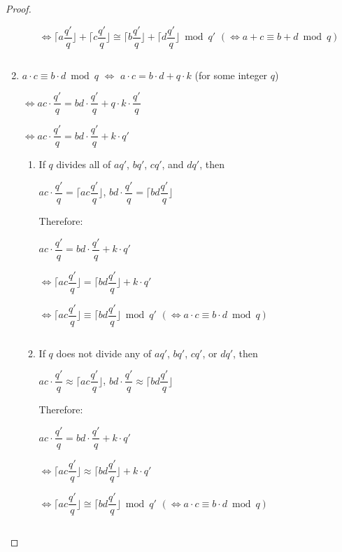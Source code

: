 \begin{proof}
\begin{enumerate}
\begin{enumerate}
$\Longleftrightarrow \Bigg\lceil a\dfrac{q'}{q}\Bigg\rfloor + \Bigg\lceil c\dfrac{q'}{q}\Bigg\rfloor \cong \Bigg\lceil b\dfrac{q'}{q}\Bigg\rfloor + \Bigg\lceil d\dfrac{q'}{q}\Bigg\rfloor \bmod q'$ \text{ } $(\Longleftrightarrow a + c \equiv b + d \bmod q)$

\end{enumerate}

$ $

\item $a \cdot c\equiv b \cdot d\bmod q$ $\Longleftrightarrow$ $a \cdot c = b \cdot d + q\cdot k$ (for some integer $q$)

$\Longleftrightarrow ac \cdot \dfrac{q'}{q}  = bd \cdot \dfrac{q'}{q} + q\cdot k \cdot \dfrac{q'}{q}$

$\Longleftrightarrow ac \cdot \dfrac{q'}{q}  = bd \cdot \dfrac{q'}{q} + k\cdot q'$

\begin{enumerate}

\item If $q$ divides all of $aq'$, $bq'$, $cq'$, and $dq'$, then 

$ac \cdot \dfrac{q'}{q} = \Bigg\lceil ac\dfrac{q'}{q}\Bigg\rfloor$, \text{ } $bd \cdot \dfrac{q'}{q} = \Bigg\lceil bd\dfrac{q'}{q}\Bigg\rfloor$

Therefore:

$ac \cdot \dfrac{q'}{q} = bd \cdot \dfrac{q'}{q} + k\cdot q'$

$\Longleftrightarrow \Bigg\lceil ac\dfrac{q'}{q}\Bigg\rfloor = \Bigg\lceil bd\dfrac{q'}{q}\Bigg\rfloor + k\cdot q'$

$\Longleftrightarrow \Bigg\lceil ac\dfrac{q'}{q}\Bigg\rfloor \equiv \Bigg\lceil bd\dfrac{q'}{q}\Bigg\rfloor \bmod q'$ \text{ } $(\Longleftrightarrow a\cdot c \equiv b\cdot d \bmod q)$

$ $

\item If $q$ does not divide any of $aq'$, $bq'$, $cq'$, or $dq'$, then

$ac \cdot \dfrac{q'}{q} \approx \Bigg\lceil ac\dfrac{q'}{q}\Bigg\rfloor$, \text{ } $bd \cdot \dfrac{q'}{q} \approx \Bigg\lceil bd\dfrac{q'}{q}\Bigg\rfloor$

Therefore:

$ac \cdot \dfrac{q'}{q} = bd \cdot \dfrac{q'}{q} + k\cdot q'$

$\Longleftrightarrow \Bigg\lceil ac\dfrac{q'}{q}\Bigg\rfloor \approx \Bigg\lceil bd\dfrac{q'}{q}\Bigg\rfloor + k\cdot q'$

$\Longleftrightarrow \Bigg\lceil ac\dfrac{q'}{q}\Bigg\rfloor \cong \Bigg\lceil bd\dfrac{q'}{q}\Bigg\rfloor \bmod q'$ \text{ } $(\Longleftrightarrow a\cdot c \equiv b\cdot d \bmod q)$

\end{enumerate}

$ $

\end{enumerate}
\end{proof}

